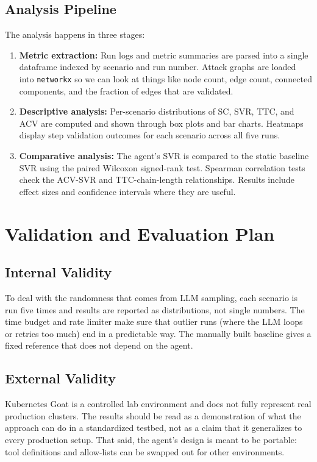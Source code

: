 \documentclass[conference]{IEEEtran}
\begin{document}
\subsection{Analysis Pipeline}
The analysis happens in three stages:
\begin{enumerate}
    \item \textbf{Metric extraction:} Run logs and metric summaries are parsed into a single dataframe indexed by scenario and run number. Attack graphs are loaded into \texttt{networkx} so we can look at things like node count, edge count, connected components, and the fraction of edges that are validated.
    \item \textbf{Descriptive analysis:} Per-scenario distributions of SC, SVR, TTC, and ACV are computed and shown through box plots and bar charts. Heatmaps display step validation outcomes for each scenario across all five runs.
    \item \textbf{Comparative analysis:} The agent's SVR is compared to the static baseline SVR using the paired Wilcoxon signed-rank test. Spearman correlation tests check the ACV-SVR and TTC-chain-length relationships. Results include effect sizes and confidence intervals where they are useful.
\end{enumerate}

\section{Validation and Evaluation Plan}

\subsection{Internal Validity}
To deal with the randomness that comes from LLM sampling, each scenario is run five times and results are reported as distributions, not single numbers. The time budget and rate limiter make sure that outlier runs (where the LLM loops or retries too much) end in a predictable way. The manually built baseline gives a fixed reference that does not depend on the agent.

\subsection{External Validity}
Kubernetes Goat is a controlled lab environment and does not fully represent real production clusters. The results should be read as a demonstration of what the approach can do in a standardized testbed, not as a claim that it generalizes to every production setup. That said, the agent's design is meant to be portable: tool definitions and allow-lists can be swapped out for other environments.
\end{document}
